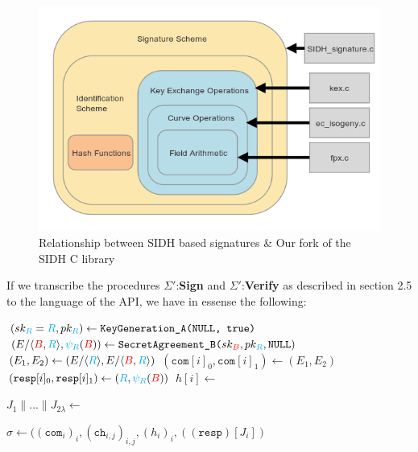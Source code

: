 \begin{figure}[htp]
\centering
\includegraphics[scale=0.7]{fullmapwcurve.png} %
\caption{Relationship between SIDH based signatures \& Our fork of the SIDH C library}
\label{fig:fullmap} %
\end{figure}

If we transcribe the procedures $\Sigma'$:\textbf{Sign} and $\Sigma'$:\textbf{Verify} as described in section 2.5 to the language of the \sidh API, we have in essense the following:\\

\begin{algorithm}
\caption{-- }\label{euclid}
\begin{algorithmic}[1]
	\State $(sk_{\textcolor{cyan}{R}} = \textcolor{cyan}{R}, pk_{\textcolor{cyan}{R}}) \gets \texttt{KeyGeneration\_A(\texttt{NULL}, \texttt{true})}$
	\State $(E/\langle \textcolor{red}{B},\textcolor{cyan}{R} \rangle, \textcolor{cyan}{\psi_R}(\textcolor{red}{B})) \gets \texttt{SecretAgreement\_B(}sk_{\textcolor{red}{B}}, pk_{\textcolor{cyan}{R}}, \texttt{NULL})$
	\State $(E_{1},E_{2}) \gets (E/\langle \textcolor{cyan}{R} \rangle, E/\langle \textcolor{red}{B},\textcolor{cyan}{R} \rangle)$
	\State $(\texttt{com}[i]_{0}, \texttt{com}[i]_{1}) \gets (E_{1}, E_{2})$
	\State $(\texttt{resp}[i]_{0}, \texttt{resp}[i]_{1}) \gets (\textcolor{cyan}{R}, \textcolor{cyan}{\psi_R}(\textcolor{red}{B}))$
	\State $h[i] \gets$ 
\EndFor

\State $J_{1} \parallel ... \parallel J_{2\lambda} \gets$ 

\State \Return $\sigma \gets ((\texttt{com}_{i})_{i}, (\texttt{ch}_{i,j})_{i,j}, (h_{i})_{i}, ((\texttt{resp})[J_{i}])$
\end{algorithmic}
\end{algorithm}

